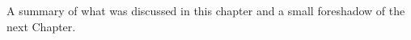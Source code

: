\label{sec:background_summary}

A summary of what was discussed in this chapter and a small foreshadow of the next Chapter.